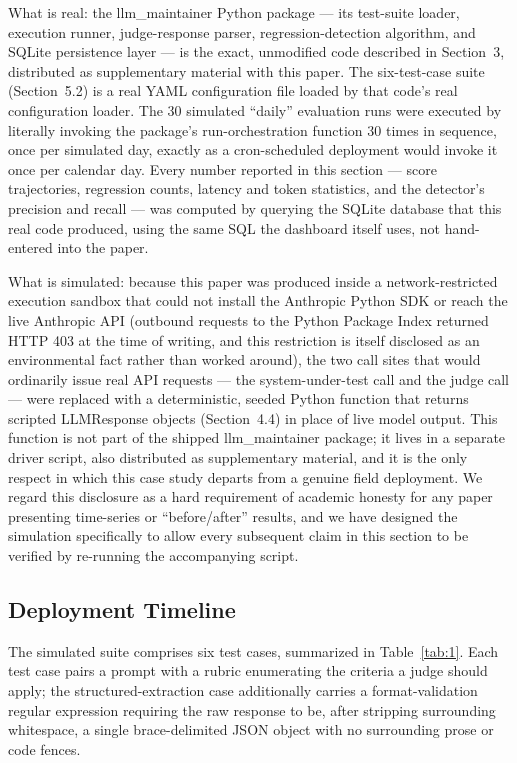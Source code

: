 \documentclass[11pt,a4paper]{article}
\begin{document}
What is real: the llm\_maintainer Python package --- its test-suite
loader, execution runner, judge-response parser, regression-detection
algorithm, and SQLite persistence layer --- is the exact, unmodified
code described in Section~3, distributed as supplementary material with
this paper. The six-test-case suite (Section~5.2) is a real YAML
configuration file loaded by that code's real
configuration loader. The 30 simulated ``daily'' evaluation runs were
executed by literally invoking the package's
run-orchestration function 30 times in sequence, once per simulated day,
exactly as a cron-scheduled deployment would invoke it once per calendar
day. Every number reported in this section --- score trajectories,
regression counts, latency and token statistics, and the
detector's precision and recall --- was computed by
querying the SQLite database that this real code produced, using the
same SQL the dashboard itself uses, not hand-entered into the paper.

What is simulated: because this paper was produced inside a
network-restricted execution sandbox that could not install the
Anthropic Python SDK or reach the live Anthropic API (outbound requests
to the Python Package Index returned HTTP 403 at the time of writing,
and this restriction is itself disclosed as an environmental fact rather
than worked around), the two call sites that would ordinarily issue real
API requests --- the system-under-test call and the judge call ---
were replaced with a deterministic, seeded Python function that returns
scripted LLMResponse objects (Section~4.4) in place of live model
output. This function is not part of the shipped llm\_maintainer
package; it lives in a separate driver script, also distributed as
supplementary material, and it is the only respect in which this case
study departs from a genuine field deployment. We regard this disclosure
as a hard requirement of academic honesty for any paper presenting
time-series or ``before/after'' results, and we have designed the
simulation specifically to allow every subsequent claim in this section
to be verified by re-running the accompanying script.

\subsection{Deployment Timeline}

The simulated suite comprises six test cases, summarized in Table~\ref{tab:1}.
Each test case pairs a prompt with a rubric enumerating the criteria a
judge should apply; the structured-extraction case additionally carries
a format-validation regular expression requiring the raw response to be,
after stripping surrounding whitespace, a single brace-delimited JSON
object with no surrounding prose or code fences.
\end{document}
